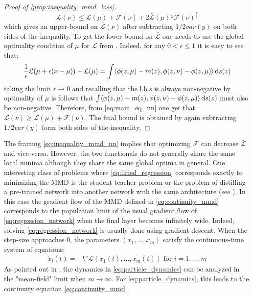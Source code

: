 \begin{proof}[Proof of \cref{prop:inequality_mmd_loss}]
\[
 \mathcal{L}(\nu)\leq \mathcal{L}(\mu)+ \mathcal{F}(\nu) + 2 \bar{\mathcal{L}}(\mu)^{\frac12}\mathcal{F(\nu)}^{\frac12}
\]
which gives an upper-bound on $\bar{\mathcal{L}}(\nu)$ after subtracting $1/2 var(y)$ on both sides of the inequality.
To get the lower bound on $\bar{\mathcal{L}}$ one needs to use the global optimality condition of $\mu$ for $\mathcal{L}$ from \cite[Porposition 3.1]{chizat2018global}. Indeed, for any $0<\epsilon\leq 1$ it is easy to see that:
\[
\frac{1}{\epsilon}\mathcal{L}(\mu +\epsilon(\nu-\mu))-\mathcal{L}(\mu) = \int \langle \phi(z,\mu)-m(z),\phi(z,\nu)-\phi(z,\mu) \rangle\mathop{}\!\mathrm{d} s(z)
\]
taking the limit $\epsilon\rightarrow 0$ and recalling that the l.h.s is always non-negative by optimality of $\mu$ is follows that $\int \langle \phi(z,\mu)-m(z),\phi(z,\nu)-\phi(z,\mu) \rangle\mathop{}\!\mathrm{d} s(z)$ must also be non-negative. Therefore, from \cref{eq:main_eq_nn} one get that $\mathcal{L}(\nu) \geq  \mathcal{L}(\mu)+ \mathcal{F}(\nu)$. The final bound is obtained by again subtracting $1/2 var(y)$ form both sides of the inequality.
\end{proof}
The framing \cref{eq:inequality_mmd_nn} implies that optimizing $\mathcal{F}$ can decrease  $\bar{\mathcal{L}}$ and vice-versa. However, the two functionals do not generally share the same local minima although they share the same global optima in general. One interesting class of problems where \cref{eq:lifted_regression} corresponds exactly to minimizing the MMD is the student-teacher problem or the problem of distilling a pre-trained network into another network with the same architecture (see \cite{rotskoff2019global}). In this case the gradient flow of the MMD defined in \cref{eq:continuity_mmd} corresponds to the population limit of the usual gradient flow of \cref{eq:regression_network} when the final layer becomes infinitely wide. Indeed, solving \cref{eq:regression_network} is usually done using gradient descent. When the step-size approaches $0$, the parameters $(x_1,...,x_m)$ satisfy the continuous-time system of equations:
\begin{align}\label{eq:particle_dynamics}
\dot{x}_i(t)= -\nabla \mathcal{L}(x_1(t),...,x_m(t)) \text{ for } i=1, \dots, m
\end{align}  
As pointed out in \cite{chizat2018global,rotskoff2018neural}, the dynamics in \cref{eq:particle_dynamics} can be analyzed in the "mean-field" limit when $m\rightarrow \infty$. For \cref{eq:particle_dynamics}, this leads to the continuity equation \cref{eq:continuity_mmd}. %

